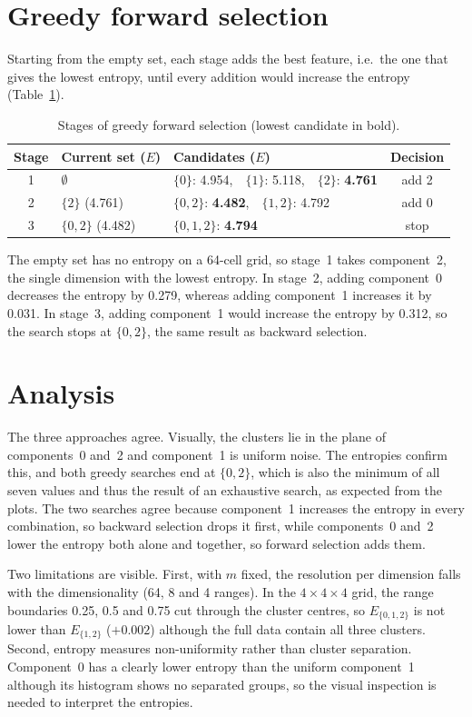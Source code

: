 \documentclass[a4paper,12pt]{article}
\begin{document}
\section{Greedy forward selection}

Starting from the empty set, each stage adds the best feature, i.e.\ the
one that gives the lowest entropy, until every addition would increase the
entropy (Table~\ref{tab:forward}).

\begin{table}[!ht]
\centering
\caption{Stages of greedy forward selection (lowest candidate in bold).}
\label{tab:forward}
\begin{tabular}{cllc}
\toprule
Stage & Current set ($E$) & Candidates ($E$) & Decision \\
\midrule
1 & $\emptyset$ & $\{0\}$: 4.954,\ \ $\{1\}$: 5.118,\ \ $\{2\}$: \textbf{4.761} & add 2 \\
2 & $\{2\}$ (4.761) & $\{0,2\}$: \textbf{4.482},\ \ $\{1,2\}$: 4.792 & add 0 \\
3 & $\{0,2\}$ (4.482) & $\{0,1,2\}$: \textbf{4.794} & stop \\
\bottomrule
\end{tabular}
\end{table}

The empty set has no entropy on a 64-cell grid, so stage~1 takes
component~2, the single dimension with the lowest entropy. In stage~2,
adding component~0 decreases the entropy by 0.279, whereas adding
component~1 increases it by 0.031. In stage~3, adding component~1 would
increase the entropy by 0.312, so the search stops at $\{0,2\}$, the same
result as backward selection.

\section{Analysis}

The three approaches agree. Visually, the clusters lie in the plane of
components~0 and~2 and component~1 is uniform noise. The entropies confirm
this, and both greedy searches end at $\{0,2\}$, which is also the minimum
of all seven values and thus the result of an exhaustive search, as
expected from the plots. The two searches agree because component~1
increases the entropy in every combination, so backward selection drops it
first, while components~0 and~2 lower the entropy both alone and together,
so forward selection adds them.

Two limitations are visible. First, with $m$ fixed, the resolution per
dimension falls with the dimensionality (64, 8 and 4 ranges). In the
$4\times4\times4$ grid, the range boundaries 0.25, 0.5 and 0.75 cut through
the cluster centres, so $E_{\{0,1,2\}}$ is not lower than $E_{\{1,2\}}$
($+0.002$) although the full data contain all three clusters. Second,
entropy measures non-uniformity rather than cluster separation.
Component~0 has a clearly lower entropy than the uniform component~1
although its histogram shows no separated groups, so the visual inspection
is needed to interpret the entropies.
\end{document}
